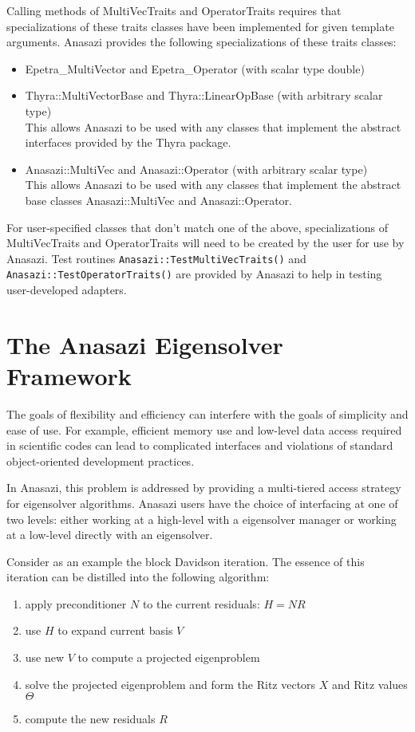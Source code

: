 Calling methods of MultiVecTraits and OperatorTraits requires that specializations of
these traits classes have been implemented for given template arguments.  
Anasazi provides the following specializations of these traits classes:
\begin{itemize}
  \item Epetra\_MultiVector and Epetra\_Operator (with scalar type double)    
  \item Thyra::MultiVectorBase and Thyra::LinearOpBase (with arbitrary scalar type) \\
        This allows Anasazi to be used with any classes that implement the abstract interfaces provided by the Thyra package.    
  \item Anasazi::MultiVec and Anasazi::Operator (with arbitrary scalar type) \\
        This allows Anasazi to be used with any classes that implement the abstract base
        classes Anasazi::MultiVec and Anasazi::Operator.
\end{itemize}

For user-specified classes that don't match one of the above, specializations of
MultiVecTraits and OperatorTraits will need to be created by the user for use by Anasazi.
Test routines \verb!Anasazi::TestMultiVecTraits()! and
\verb!Anasazi::TestOperatorTraits()! are provided by Anasazi to help in testing
user-developed adapters.


\section{The Anasazi Eigensolver Framework}
\label{sec:anasazi:solver_framework}

The goals of flexibility and efficiency can interfere with the goals of simplicity and
ease of use. For example, efficient memory use and low-level data access required in
scientific codes can lead to complicated interfaces and violations of standard
object-oriented development practices.

In Anasazi, this problem is addressed by providing a multi-tiered access strategy for
eigensolver algorithms. Anasazi users have the choice of interfacing at one of two levels:
either working at a high-level with a eigensolver manager or working at a low-level
directly with an eigensolver.

Consider as an example the block Davidson iteration. The essence of this iteration can be
distilled into the following algorithm:
\begin{enumerate}
  \item apply preconditioner $N$ to the current residuals: $H = N R$
  \item use $H$ to expand current basis $V$
  \item use new $V$ to compute a projected eigenproblem
  \item solve the projected eigenproblem and form the Ritz vectors $X$ and Ritz values
    $\Theta$ 
  \item compute the new residuals $R$
\end{enumerate}

